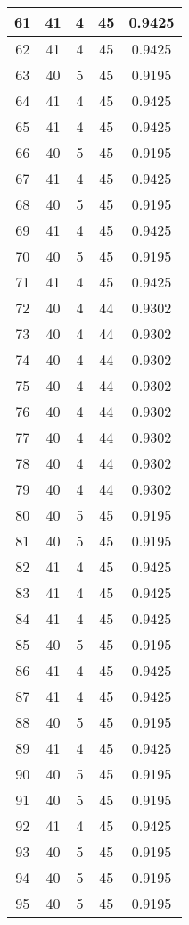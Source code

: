 \documentclass[letterpaper, 12pt]{article}
\begin{document}
\begin{longtable}{|c|c|c|c|c|}
61 & 41 & 4 & 45 & 0.9425 \\
\hline
62 & 41 & 4 & 45 & 0.9425 \\
\hline
63 & 40 & 5 & 45 & 0.9195 \\
\hline
64 & 41 & 4 & 45 & 0.9425 \\
\hline
65 & 41 & 4 & 45 & 0.9425 \\
\hline
66 & 40 & 5 & 45 & 0.9195 \\
\hline
67 & 41 & 4 & 45 & 0.9425 \\
\hline
68 & 40 & 5 & 45 & 0.9195 \\
\hline
69 & 41 & 4 & 45 & 0.9425 \\
\hline
70 & 40 & 5 & 45 & 0.9195 \\
\hline
71 & 41 & 4 & 45 & 0.9425 \\
\hline
72 & 40 & 4 & 44 & 0.9302 \\
\hline
73 & 40 & 4 & 44 & 0.9302 \\
\hline
74 & 40 & 4 & 44 & 0.9302 \\
\hline
75 & 40 & 4 & 44 & 0.9302 \\
\hline
76 & 40 & 4 & 44 & 0.9302 \\
\hline
77 & 40 & 4 & 44 & 0.9302 \\
\hline
78 & 40 & 4 & 44 & 0.9302 \\
\hline
79 & 40 & 4 & 44 & 0.9302 \\
\hline
80 & 40 & 5 & 45 & 0.9195 \\
\hline
81 & 40 & 5 & 45 & 0.9195 \\
\hline
82 & 41 & 4 & 45 & 0.9425 \\
\hline
83 & 41 & 4 & 45 & 0.9425 \\
\hline
84 & 41 & 4 & 45 & 0.9425 \\
\hline
85 & 40 & 5 & 45 & 0.9195 \\
\hline
86 & 41 & 4 & 45 & 0.9425 \\
\hline
87 & 41 & 4 & 45 & 0.9425 \\
\hline
88 & 40 & 5 & 45 & 0.9195 \\
\hline
89 & 41 & 4 & 45 & 0.9425 \\
\hline
90 & 40 & 5 & 45 & 0.9195 \\
\hline
91 & 40 & 5 & 45 & 0.9195 \\
\hline
92 & 41 & 4 & 45 & 0.9425 \\
\hline
93 & 40 & 5 & 45 & 0.9195 \\
\hline
94 & 40 & 5 & 45 & 0.9195 \\
\hline
95 & 40 & 5 & 45 & 0.9195 \\

\end{longtable}
\end{document}

